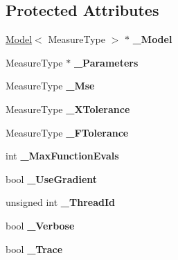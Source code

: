 \subsection*{Protected Attributes}
\begin{DoxyCompactItemize}
\item 
\hyperlink{class_ox_1_1_model}{Model}$<$ Measure\+Type $>$ $\ast$ {\bfseries \+\_\+\+Model}\hypertarget{class_ox_1_1_fitter_ae5a2d2967fb117386a4b73123f188213}{}\label{class_ox_1_1_fitter_ae5a2d2967fb117386a4b73123f188213}

\item 
Measure\+Type $\ast$ {\bfseries \+\_\+\+Parameters}\hypertarget{class_ox_1_1_fitter_a508e5654aaf79dd744ec816d95b7e33c}{}\label{class_ox_1_1_fitter_a508e5654aaf79dd744ec816d95b7e33c}

\item 
Measure\+Type {\bfseries \+\_\+\+Mse}\hypertarget{class_ox_1_1_fitter_a1c5f4e7fa0764489e30685f47fe53190}{}\label{class_ox_1_1_fitter_a1c5f4e7fa0764489e30685f47fe53190}

\item 
Measure\+Type {\bfseries \+\_\+\+X\+Tolerance}\hypertarget{class_ox_1_1_fitter_af91a5ea8fb20072277ddcd64f5537b09}{}\label{class_ox_1_1_fitter_af91a5ea8fb20072277ddcd64f5537b09}

\item 
Measure\+Type {\bfseries \+\_\+\+F\+Tolerance}\hypertarget{class_ox_1_1_fitter_a926f6cf38998f041c31b079e93bf27ab}{}\label{class_ox_1_1_fitter_a926f6cf38998f041c31b079e93bf27ab}

\item 
int {\bfseries \+\_\+\+Max\+Function\+Evals}\hypertarget{class_ox_1_1_fitter_a6d9fc92b80690df062a7ad9af21e135d}{}\label{class_ox_1_1_fitter_a6d9fc92b80690df062a7ad9af21e135d}

\item 
bool {\bfseries \+\_\+\+Use\+Gradient}\hypertarget{class_ox_1_1_fitter_a34c039e87d52c28b19092535a171264f}{}\label{class_ox_1_1_fitter_a34c039e87d52c28b19092535a171264f}

\item 
unsigned int {\bfseries \+\_\+\+Thread\+Id}\hypertarget{class_ox_1_1_fitter_a0d97d7a9c9fad0349484151464fefe4f}{}\label{class_ox_1_1_fitter_a0d97d7a9c9fad0349484151464fefe4f}

\item 
bool {\bfseries \+\_\+\+Verbose}\hypertarget{class_ox_1_1_fitter_a6457339f5252c85d7c92f20439544975}{}\label{class_ox_1_1_fitter_a6457339f5252c85d7c92f20439544975}

\item 
bool {\bfseries \+\_\+\+Trace}\hypertarget{class_ox_1_1_fitter_a9ba79cb05ecc670254b3e7ddafc519ab}{}\label{class_ox_1_1_fitter_a9ba79cb05ecc670254b3e7ddafc519ab}

\end{DoxyCompactItemize}


